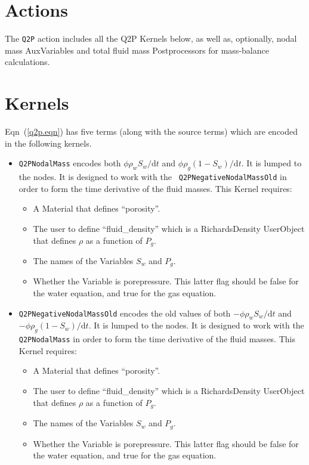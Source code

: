 \documentclass[]{scrreprt}
\begin{document}
\section{Actions}

The {\tt Q2P} action includes all the Q2P Kernels below, as well as,
optionally, nodal mass AuxVariables and total fluid mass
Postprocessors for mass-balance calculations.

\section{Kernels}

Eqn~(\ref{q2p.eqn}) has five terms (along with the source terms) which
are encoded in the following kernels.

\begin{itemize}

\item {\tt Q2PNodalMass} encodes both $\phi \rho_{w}
  S_{w}/{\mathrm{d}}t$ and $\phi \rho_{g} (1 - S_{w})/{\mathrm{d}}t$.
  It is lumped to the nodes.  It is designed to work with the {\tt
    Q2PNegativeNodalMassOld} in order to form the time derivative of
  the fluid masses.  This Kernel requires:
\begin{itemize}
\item A Material that defines ``porosity''.
\item The user to define ``fluid\_density'' which is a RichardsDensity
  UserObject that defines $\rho$ as a function of $P_{g}$.
\item The names of the Variables $S_{w}$ and $P_{g}$.
\item Whether the Variable is porepressure.  This latter flag should
  be false for the water equation, and true for the gas equation.
\end{itemize}

\item {\tt Q2PNegativeNodalMassOld} encodes the old values of both
  $-\phi \rho_{w} S_{w}/{\mathrm{d}}t$ and $-\phi \rho_{g} (1 -
  S_{w})/{\mathrm{d}}t$.  It is lumped to the nodes.  It is designed
  to work with the {\tt Q2PNodalMass} in order to form the
  time derivative of the fluid masses.  This Kernel requires:
\begin{itemize}
\item A Material that defines ``porosity''.
\item The user to define ``fluid\_density'' which is a RichardsDensity
  UserObject that defines $\rho$ as a function of $P_{g}$.
\item The names of the Variables $S_{w}$ and $P_{g}$.
\item Whether the Variable is porepressure.  This latter flag should
  be false for the water equation, and true for the gas equation.
\end{itemize}


\end{itemize}
\end{document}

